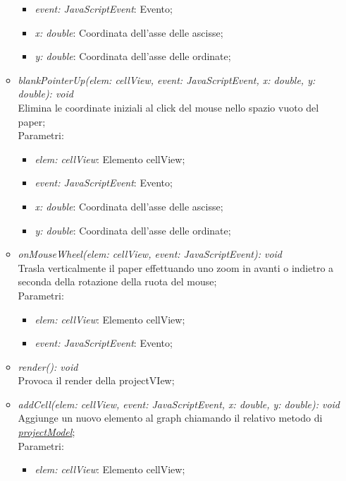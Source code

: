 \documentclass[../DefinizioneDiProdotto.tex]{subfiles}
\begin{document}
\begin{itemize}
\begin{itemize}
\begin{itemize}
								\item \emph{event: JavaScriptEvent}: Evento;
								\item \emph{x: double}: Coordinata dell'asse delle ascisse;
								\item \emph{y: double}: Coordinata dell'asse delle ordinate;
							\end{itemize}
							\item \emph{blankPointerUp(elem: cellView, event: JavaScriptEvent, x: double, y: double): void} \\
							Elimina le coordinate iniziali al click del mouse nello spazio vuoto del paper; \\
							Parametri:
							\begin{itemize}
								\item \emph{elem: cellView}: Elemento cellView;
								\item \emph{event: JavaScriptEvent}: Evento;
								\item \emph{x: double}: Coordinata dell'asse delle ascisse;
								\item \emph{y: double}: Coordinata dell'asse delle ordinate;
							\end{itemize}
							\item \emph{onMouseWheel(elem: cellView, event: JavaScriptEvent): void} \\
							Trasla verticalmente il paper effettuando uno zoom in avanti o indietro a seconda della rotazione della ruota del mouse; \\
							Parametri:
							\begin{itemize}
								\item \emph{elem: cellView}: Elemento cellView;
								\item \emph{event: JavaScriptEvent}: Evento;
							\end{itemize}
							\item \emph{render(): void} \\
							Provoca il render della projectVIew;
							\item \emph{addCell(elem: cellView, event: JavaScriptEvent, x: double, y: double): void} \\
							Aggiunge un nuovo elemento al graph chiamando il relativo metodo di \hyperlink{SWEDesigner::Model::projectModel}{\emph{projectModel}}; \\
							Parametri:
							\begin{itemize}
								\item \emph{elem: cellView}: Elemento cellView;

\end{itemize}
\end{itemize}
\end{itemize}
\end{document}
